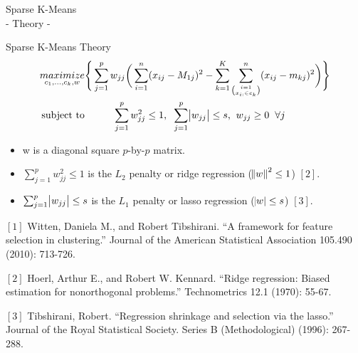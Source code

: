 \documentclass{beamer}
\newlength{\tmpShadow}
\newcommand{\MyShadow}[2]{%
	\settowidth{\tmpShadow}{#1}
	\addtolength{\tmpShadow}{.1em}
	\raisebox{-0.25ex}{\textcolor{gray!70}{#1}}%
	\kern-\tmpShadow%
	\textcolor{#2}{#1}%
}
\newcounter{mycounter}
\newenvironment{noindlist}
{\begin{list}{}{\usecounter{mycounter} \labelsep=0em \labelwidth=0em \leftmargin=0em \itemindent=0em}}
	{\end{list}}
\begin{document}
{\begin{frame}[plain,c]
	\begin{center}
		\Huge Sparse K-Means\\
		\Huge - Theory -
	\end{center}
\end{frame}

\begin{frame}{Sparse K-Means Theory}
	\begin{align}\nonumber
		\underset{c_1,\dots,c_k,w}{maximize}& \Bigg\{ \sum_{j=1}^{p} w_{jj} \bigg( \sum_{i=1}^{n}(x_{ij}-M_{1j})^2 - \sum_{k=1}^{K}\sum_{\binom{i=1}{x_{i:} \in c_k}}^{n}(x_{ij}-m_{kj})^2 \bigg) \Bigg\}  \\ \nonumber
		\text{subject to}& \hphantom{xxxxx} \sum_{j=1}^{p} w_{jj}^{2} \leq 1 \text{,}\hphantom{x} \sum_{j=1}^{p} \abs{w_{jj}} \leq s \text{,}\hphantom{x} w_{jj} \geq 0\hphantom{x} \forall j 
	\end{align}	
	\vspace{3mm}
	\begin{itemize}[label={\MyShadow{$\bullet$}{green!80}}]
		\item<2-> w is a diagonal square $p$-by-$p$ matrix.
		\vspace{3mm}
		\item<2-> $\sum_{j=1}^{p} w_{jj}^{2} \leq 1$ is the $L_2$ penalty or ridge regression ($\norm{w}^{2} \leq 1$) $[2]$.	
		\vspace{3mm}
		\item<2-> $\sum_{j=1}^{p} \abs{w_{jj}} \leq s$ is the $L_1$ penalty or lasso regression ($\abs{w} \leq s$) $[3]$.					
	\end{itemize}	
	
	\vspace{5mm}
	\begin{tiny}
		\begin{noindlist}
			\item $[1]$ Witten, Daniela M., and Robert Tibshirani. ``A framework for feature selection in clustering.'' Journal of the American Statistical Association 105.490 (2010): 713-726.
			\item<2-> $[2]$ Hoerl, Arthur E., and Robert W. Kennard. ``Ridge regression: Biased estimation for nonorthogonal problems.'' Technometrics 12.1 (1970): 55-67.	
			\item<2-> $[3]$ Tibshirani, Robert. ``Regression shrinkage and selection via the lasso.'' Journal of the Royal Statistical Society. Series B (Methodological) (1996): 267-288.						
		\end{noindlist}
	\end{tiny}	
\end{frame}

}
\end{document}
